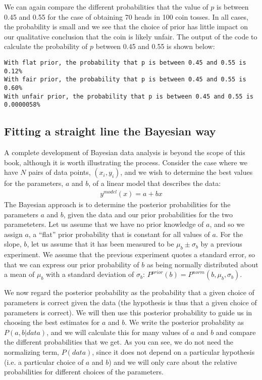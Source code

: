 
We can again compare the different probabilities that the value of $p$ is between 0.45 and 0.55 for the case of obtaining 70 heads in 100 coin tosses. In all cases, the probability is small and we see that the choice of prior has little impact on our qualitative conclusion that the coin is likely unfair. The output of the code to calculate the probability of $p$ between 0.45 and 0.55 is shown below:
\begin{verbatim}
With flat prior, the probability that p is between 0.45 and 0.55 is 0.12%
With fair prior, the probability that p is between 0.45 and 0.55 is 0.60%
With unfair prior, the probability that p is between 0.45 and 0.55 is 0.0000058%
\end{verbatim}

\clearpage
\subsection{Fitting a straight line the Bayesian way}
A complete development of Bayesian data analysis is beyond the scope of this book, although it is worth illustrating the process. Consider the case where we have $N$ pairs of data points, $(x_i,y_i)$, and we wish to determine the best values for the parameters, $a$ and $b$, of a linear model that describes the data:
\begin{align*}
y^{model}(x) = a+bx
\end{align*}
The Bayesian approach is to determine the posterior probabilities for the parameters $a$ and $b$, given the data and our prior probabilities for the two parameteters. Let us assume that we have no prior knowledge of $a$, and so we assign $a$, a ``flat'' prior probability that is constant for all values of $a$.  For the slope, $b$, let us assume that it has been measured to be  $\mu_b\pm\sigma_b$ by a previous experiment. We assume that the previous experiment quotes a standard error, so that we can express our prior probability of $b$ as being normally distributed about a mean of $\mu_b$ with a standard deviation of $\sigma_b$: $P^{prior}(b)=P^{norm}(b,\mu_b,\sigma_b)$.

We now regard the posterior probability as the probability that a given choice of parameters is correct given the data (the hypothesis is thus that a given choice of parameters is correct). We will then use this posterior probability to guide us in choosing the best estimates for $a$ and $b$. We write the posterior probability as $P(a,b|data)$, and we will calculate this for many values of $a$ and $b$ and compare the different probabilities that we get. As you can see, we do not need the normalizing term, $P(data)$, since it does not depend on a particular hypothesis (i.e. a particular choice of $a$ and $b$) and we will only care about the relative probabilities for different choices of the parameters.

